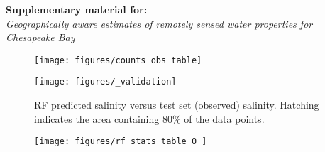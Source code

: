 \documentclass[12pt]{article}
\begin{document}
\begin{center}
\textbf{Supplementary material for:}\\
\emph{Geographically aware estimates of remotely sensed water properties for Chesapeake Bay}
\end{center}

\begin{figure}[h!]
    \begin{center}
          \texttt{[image: figures/counts\_obs\_table]}
    \end{center}    
\end{figure}

\begin{figure}[h!]
    \begin{center}
          \texttt{[image: figures/\_validation]}
          \caption{RF predicted salinity versus test set (observed) salinity. Hatching indicates the area containing 80\% of the data points.}
    \end{center}    
\end{figure}

\begin{figure}[h!]
    \begin{center}
          \texttt{[image: figures/rf\_stats\_table\_0\_]}
    \end{center}    
\end{figure}

\clearpage
\end{document}
